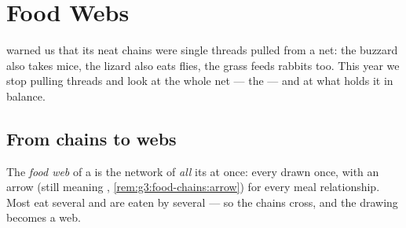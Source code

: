 \chapter{Food Webs}\label{ch:g5:food-webs}

 warned us that its neat chains were
single threads pulled from a net: the buzzard also takes
mice, the lizard also eats flies, the grass feeds rabbits
too. This year we stop pulling threads and look at the whole
net --- the  --- and at what holds it in balance.

\section{From chains to webs}

\begin{definition}\label{def:g5:food-webs:web}
The \emph{food web} of a  is the
network of \emph{all} its  at once: every 
drawn once, with an arrow (still meaning \emph{},
\cref{rem:g3:food-chains:arrow}) for every meal
relationship. Most  eat several  and are eaten
by several --- so the chains cross, and the drawing becomes
a web.
\end{definition}

